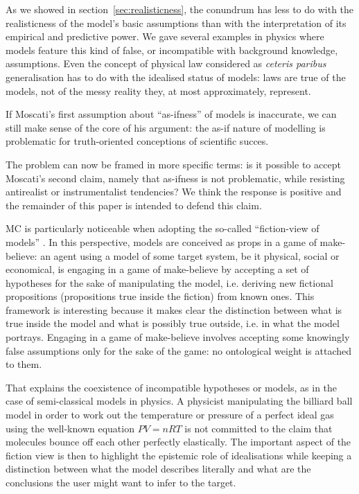 \documentclass[a4paper,11pt]{article}
\theoremstyle{definition}
\begin{document}
As we showed in section~\ref{sec:realisticness}, the conundrum has less to do with the realisticness of the model's basic assumptions than with the interpretation of its empirical and predictive power. We gave several examples in physics where models feature this kind of false, or incompatible with background knowledge, assumptions. Even the concept of physical law considered as \textit{ceteris paribus} generalisation \citep{Cartwright1983} has to do with the idealised status of models: laws are true of the models, not of the messy reality they, at most approximately, represent.

If Moscati's first assumption about ``as-ifness'' of models is inaccurate, we can still make sense of the core of his argument: the as-if nature of modelling is problematic for truth-oriented conceptions of scientific succes.

The problem can now be framed in more specific terms: is it possible to accept Moscati's second claim, namely that as-ifness is not problematic, while resisting antirealist or instrumentalist tendencies? We think the response is positive and the remainder of this paper is intended to defend this claim.

MC is particularly noticeable when adopting the so-called ``fiction-view of models'' \citep{Frigg2016, Frigg2020, Toon2012}. In this perspective, models are conceived as props in a game of make-believe: an agent using a model of some target system, be it physical, social or economical, is engaging in a game of make-believe by accepting a set of hypotheses for the sake of manipulating the model, i.e. deriving new fictional propositions (propositions true inside the fiction) from known ones. This framework is interesting because it makes clear the distinction between what is true inside the model and what is possibly true outside, i.e. in what the model portrays. Engaging in a game of make-believe involves accepting some knowingly false assumptions only for the sake of the game: no ontological weight is attached to them.

That explains the coexistence of incompatible hypotheses or models, as in the case of semi-classical models in physics. A physicist manipulating the billiard ball model in order to work out the temperature or pressure of a perfect ideal gas using the well-known equation $PV=nRT$ is not committed to the claim that molecules bounce off each other perfectly elastically. The important aspect of the fiction view is then to highlight the epistemic role of idealisations while keeping a distinction between what the model describes literally and what are the conclusions the user might want to infer to the target.
\end{document}
